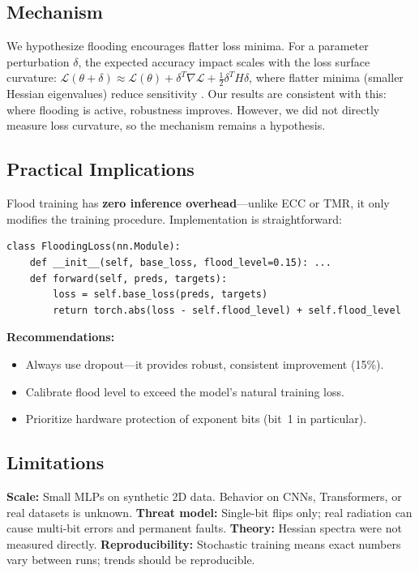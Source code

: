 \documentclass{article}
\begin{document}
\subsection{Mechanism}

We hypothesize flooding encourages flatter loss minima. For a parameter perturbation $\delta$, the expected accuracy impact scales with the loss surface curvature: $\mathcal{L}(\theta + \delta) \approx \mathcal{L}(\theta) + \delta^T\nabla\mathcal{L} + \frac{1}{2}\delta^T H \delta$, where flatter minima (smaller Hessian eigenvalues) reduce sensitivity \cite{hochreiter1997flat}. Our results are consistent with this: where flooding is active, robustness improves. However, we did not directly measure loss curvature, so the mechanism remains a hypothesis.

\subsection{Practical Implications}

Flood training has \textbf{zero inference overhead}---unlike ECC or TMR, it only modifies the training procedure. Implementation is straightforward:

\begin{verbatim}
class FloodingLoss(nn.Module):
    def __init__(self, base_loss, flood_level=0.15): ...
    def forward(self, preds, targets):
        loss = self.base_loss(preds, targets)
        return torch.abs(loss - self.flood_level) + self.flood_level
\end{verbatim}

\textbf{Recommendations:}
\begin{itemize}
	\item Always use dropout---it provides robust, consistent improvement (15\%).
	\item Calibrate flood level to exceed the model's natural training loss.
	\item Prioritize hardware protection of exponent bits (bit~1 in particular).
\end{itemize}

\subsection{Limitations}
\label{sec:limitations}

\textbf{Scale:} Small MLPs on synthetic 2D data. Behavior on CNNs, Transformers, or real datasets is unknown.
\textbf{Threat model:} Single-bit flips only; real radiation can cause multi-bit errors and permanent faults.
\textbf{Theory:} Hessian spectra were not measured directly.
\textbf{Reproducibility:} Stochastic training means exact numbers vary between runs; trends should be reproducible.
\end{document}
